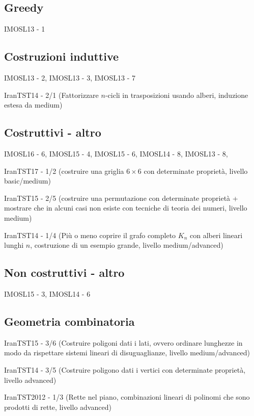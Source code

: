 \documentclass[a4paper,10pt]{article}
\newcommand{\Pro}[3]{#1#2 - #3}
\begin{document}
\subsection{Greedy}
\Pro{IMOSL}{13}{1}

\subsection{Costruzioni induttive}
\Pro{IMOSL}{13}{2}, \Pro{IMOSL}{13}{3}, \Pro{IMOSL}{13}{7}

\Pro{IranTST}{14}{2/1} (Fattorizzare $n$-cicli in trasposizioni usando alberi, induzione estesa da medium)

\subsection{Costruttivi - altro}
\Pro{IMOSL}{16}{6}, \Pro{IMOSL}{15}{4}, \Pro{IMOSL}{15}{6}, \Pro{IMOSL}{14}{8}, \Pro{IMOSL}{13}{8},

\Pro{IranTST}{17}{1/2} (costruire una griglia $6\times 6$ con determinate proprietà, livello basic/medium)

\Pro{IranTST}{15}{2/5} (costruire una permutazione con determinate proprietà + mostrare che in alcuni casi non esiste con tecniche
di teoria dei numeri, livello medium)

\Pro{IranTST}{14}{1/4} (Più o meno coprire il grafo completo $K_n$ con alberi lineari lunghi $n$, costruzione di un esempio grande,
livello medium/advanced)

\subsection{Non costruttivi - altro}
\Pro{IMOSL}{15}{3}, \Pro{IMOSL}{14}{6}

\subsection{Geometria combinatoria}
\Pro{IranTST}{15}{3/6} (Costruire poligoni dati i lati, ovvero ordinare lunghezze in modo da rispettare sistemi lineari di
disuguaglianze, livello medium/advanced)

\Pro{IranTST}{14}{3/5} (Costruire poligono dati i vertici con determinate proprietà, livello advanced)

\Pro{IranTST}{2012}{1/3} (Rette nel piano, combinazioni lineari di polinomi che sono prodotti di rette, livello advanced)
\end{document}
